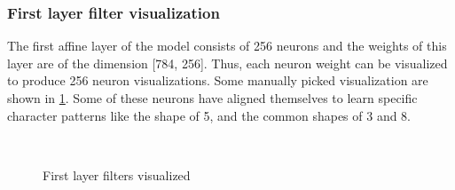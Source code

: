 \documentclass[10pt,twocolumn,letterpaper]{article}
\begin{document}
\subsubsection{First layer filter visualization}

The first affine layer of the model consists of 256 neurons and the weights of this layer are of the dimension [784, 256]. Thus, each neuron weight can be visualized to produce 256 neuron visualizations. Some manually picked visualization are shown in \ref{fig:fc1-filtervis}. Some of these neurons have aligned themselves to learn specific character patterns like the shape of 5, and the common shapes of 3 and 8.


\begin{figure}%
    \centering
    \\    
    \centering
    
    \caption{First layer filters visualized}%
    \label{fig:fc1-filtervis}%
\end{figure}
\end{document}
